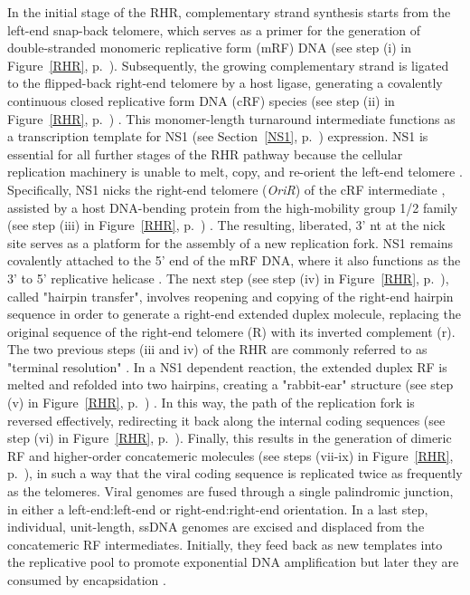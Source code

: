 In the initial stage of the RHR, complementary strand synthesis starts from the left-end snap-back telomere, which serves as a primer for the generation of double-stranded monomeric replicative form (mRF) DNA (see step (i) in Figure~\ref{RHR}, p.~\pageref{RHR}). Subsequently, the growing complementary strand is ligated to the flipped-back right-end telomere by a host ligase, generating a covalently continuous closed replicative form DNA (cRF) species (see step (ii) in Figure~\ref{RHR}, p.~\pageref{RHR}) \cite{pmid2911112, pmid2543770}. This monomer-length turnaround intermediate functions as a transcription template for NS1 (see Section~\ref{NS1}, p.~\pageref{NS1}) expression. NS1 is essential for all further stages of the RHR pathway because the cellular replication machinery is unable to melt, copy, and re-orient the left-end telomere \cite{pmid8995615}. Specifically, NS1 nicks the right-end telomere (\textit{OriR}) of the cRF intermediate \cite{pmid9349487}, assisted by a host DNA-bending protein from the high-mobility group 1/2 family (see step (iii) in Figure~\ref{RHR}, p.~\pageref{RHR}) \cite{pmid9765384}. The resulting, liberated, 3' nt at the nick site serves as a platform for the assembly of a new replication fork. NS1 remains covalently attached to the 5' end of the mRF DNA, where it also functions as the 3' to 5' replicative helicase \cite{pmid12050365, pmid3339715, pmid3203742}. The next step (see step (iv) in Figure~\ref{RHR}, p.~\pageref{RHR}), called "hairpin transfer", involves reopening and copying of the right-end hairpin sequence in order to generate a right-end extended duplex molecule, replacing the original sequence of the right-end telomere (R) with its inverted complement (r). The two previous steps (iii and iv) of the RHR are commonly referred to as "terminal resolution" \cite{telomere2}. In a NS1 dependent reaction, the extended duplex RF is melted and refolded into two hairpins, creating a "rabbit-ear" structure (see step (v) in Figure~\ref{RHR}, p.~\pageref{RHR}) \cite{pmid14997524, pmid12075084}. In this way, the path of the replication fork is reversed effectively, redirecting it back along the internal coding sequences (see step (vi) in Figure~\ref{RHR}, p.~\pageref{RHR}). Finally, this results in the generation of dimeric RF and higher-order concatemeric molecules (see steps (vii-ix) in Figure~\ref{RHR}, p.~\pageref{RHR}), in such a way that the viral coding sequence is replicated twice as frequently as the telomeres. Viral genomes are fused through a single palindromic junction, in either a left-end:left-end or right-end:right-end orientation. In a last step, individual, unit-length, ssDNA genomes are excised and displaced from the concatemeric RF intermediates. Initially, they feed back as new templates into the replicative pool to promote exponential DNA amplification but later they are consumed by encapsidation \cite{pmid15681430, encapsidation}.           


